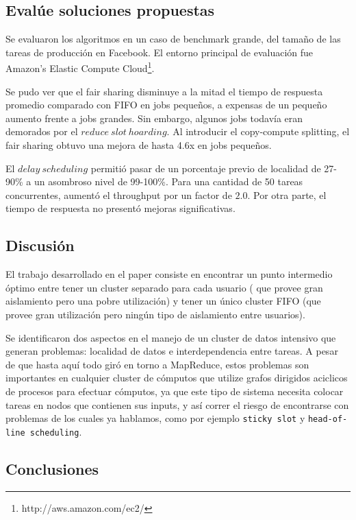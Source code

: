 \documentclass[11pt, a4paper, twoside]{article}
\begin{document}
\clearpage
\subsection {\footnotesize Evalúe soluciones propuestas}
\label{investigacion-7}

Se evaluaron los algoritmos en un caso de benchmark grande, del tamaño de las tareas de producción en Facebook. El entorno principal de evaluación fue Amazon's Elastic Compute Cloud\footnote{http://aws.amazon.com/ec2/}.

Se pudo ver que el fair sharing disminuye a la mitad el tiempo de respuesta promedio comparado con FIFO en jobs pequeños, a expensas de un pequeño aumento frente a jobs grandes. Sin embargo, algunos jobs todavía eran demorados por el $reduce\ slot\ hoarding$. Al introducir el copy-compute splitting, el fair sharing obtuvo una mejora de hasta 4.6x en jobs pequeños.

El $delay\ scheduling$ permitió pasar de un porcentaje previo de localidad de 27-90\% a un asombroso nivel de 99-100\%. Para una cantidad de 50 tareas concurrentes, aumentó el throughput por un factor de $2.0$. Por otra parte, el tiempo de respuesta no presentó mejoras significativas.

\clearpage
\subsection {\footnotesize Discusión}
\label{investigacion-8}

El trabajo desarrollado en el paper consiste en encontrar un punto
intermedio óptimo entre tener un cluster separado para cada usuario (
que provee gran aislamiento pero una pobre utilización) y tener un único
cluster FIFO (que provee gran utilización pero ningún tipo de
aislamiento entre usuarios).

Se identificaron dos aspectos en el manejo de un cluster de datos
intensivo que generan problemas: localidad de datos e interdependencia
entre tareas. A pesar de que hasta aquí  todo giró en torno a MapReduce, estos
problemas son importantes en cualquier cluster de cómputos que utilize
grafos dirigidos aciclicos de procesos para efectuar cómputos, ya que este
tipo de sistema necesita colocar tareas en nodos que contienen sus inputs, y
así correr el riesgo de encontrarse con problemas de los cuales ya hablamos,
como por ejemplo \texttt{sticky slot}  y \texttt{head-of-line scheduling}.

\clearpage
\subsection {\footnotesize Conclusiones}
\label{investigacion-9}
\end{document}
